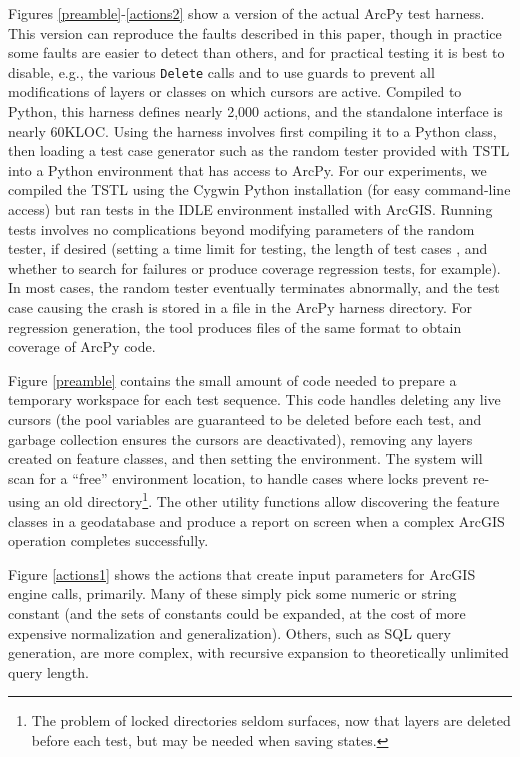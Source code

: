 Figures \ref{preamble}-\ref{actions2} show a
version of the actual ArcPy test harness.  This version can reproduce the faults
described in this paper, though in practice some faults are easier to
detect than others, and for practical testing it is best to disable,
e.g., the various {\tt Delete} calls and to use guards to prevent all modifications of
layers or classes on which cursors are active.  Compiled to Python,
this harness defines nearly 2,000 actions, and the standalone
interface is nearly 60KLOC.  Using the harness involves first
compiling it to a Python class, then loading a test case generator
such as the random tester provided with TSTL into a Python environment
that has access to ArcPy.  For our experiments, we compiled the TSTL
using the Cygwin Python installation (for easy command-line access) but ran
tests in the IDLE environment installed with ArcGIS.
Running tests involves no complications beyond modifying parameters of
the random tester, if desired (setting a time limit for testing, the
length of test cases \cite{ASE08}, and whether to search for failures or produce
coverage regression tests, for example).  In most cases, the random tester
eventually terminates abnormally, and the test case causing the crash
is stored in a file in the ArcPy harness directory.  For regression
generation, the tool produces files of the same format to obtain
coverage of ArcPy code.

Figure \ref{preamble} contains the small amount of code needed to
prepare a temporary workspace for each test sequence.  This code
handles deleting any live cursors (the pool variables are guaranteed
to be deleted before each test, and garbage collection ensures the
cursors are deactivated), removing any layers created on feature
classes, and then setting the environment.  The system will scan for a
``free'' environment location, to handle cases where locks prevent
re-using an old directory\footnote{The problem of locked directories
  seldom surfaces, now that layers are deleted before each test, but
  may be needed when saving states.}.  The other utility functions
allow discovering the feature classes in a geodatabase and produce a
report on screen when a complex ArcGIS operation completes
successfully.

Figure \ref{actions1} shows the actions that create
input parameters for ArcGIS engine calls, primarily.  Many of these
simply pick some numeric or string constant (and the sets of constants
could be expanded, at the cost of more expensive normalization and
generalization).  Others, such as SQL query generation, are more
complex, with recursive expansion to theoretically unlimited query
length.  

